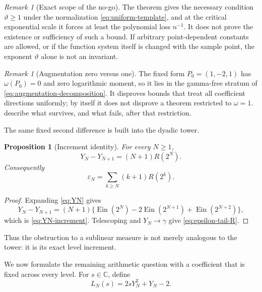 \documentclass[11pt]{article}
\theoremstyle{keio}
\newtheorem{proposition}[theorem]{Proposition}
\theoremstyle{definition}
\theoremstyle{remark}
\newtheorem{remark}[theorem]{Remark}
\newcommand{\C}{\mathbb C}
\newcommand{\Ein}{\operatorname{Ein}}
\begin{document}
\begin{remark}[Exact scope of the no-go]
The theorem gives the necessary condition \(\vartheta\ge1\) under the
normalization \eqref{eq:uniform-template}, and at the critical exponential
scale it forces at least the polynomial loss \(n^{-1}\).  It does not prove
the existence or sufficiency of such a bound.  If arbitrary point-dependent
constants are allowed, or if the function system itself is changed with the
sample point, the exponent \(\vartheta\) alone is not an invariant.
\end{remark}

\begin{remark}[Augmentation zero versus one]
The fixed form \(P_0=(1,-2,1)\) has \(\omega(P_0)=0\) and zero logarithmic
moment, so it lies in the gamma-free stratum of
\eqref{eq:augmentation-decomposition}.  It disproves bounds that treat all
coefficient directions uniformly; by itself it does not disprove a theorem
restricted to \(\omega=1\).
describe what survives, and what fails, after that restriction.
\end{remark}

The same fixed second difference is built into the dyadic tower.

\begin{proposition}[Increment identity]
\label{prop:increment-identity}
For every \(N\ge1\),
\begin{equation}\label{eq:YN-increment}
 \boxed{\displaystyle
 Y_N-Y_{N+1}=(N+1)R(2^N).}
\end{equation}
Consequently
\begin{equation}\label{eq:epsilon-tail-R}
 \varepsilon_N=\sum_{k\ge N}(k+1)R(2^k).
\end{equation}
\end{proposition}

\begin{proof}
Expanding \eqref{eq:YN} gives
\[
 Y_N-Y_{N+1}
 =(N+1)\{\Ein(2^N)-2\Ein(2^{N+1})+\Ein(2^{N+2})\},
\]
which is \eqref{eq:YN-increment}.  Telescoping and
\(Y_N\to\gamma\) give \eqref{eq:epsilon-tail-R}.
\end{proof}

Thus the obstruction to a sublinear measure is not merely analogous to the
tower: it is its exact level increment.

We now formulate the remaining arithmetic question with a coefficient that
is fixed across every level.  For \(s\in\C\), define
\begin{equation}\label{eq:LN-def}
 L_N(s)=2sY_N^2+Y_N-2.
\end{equation}
\end{document}
